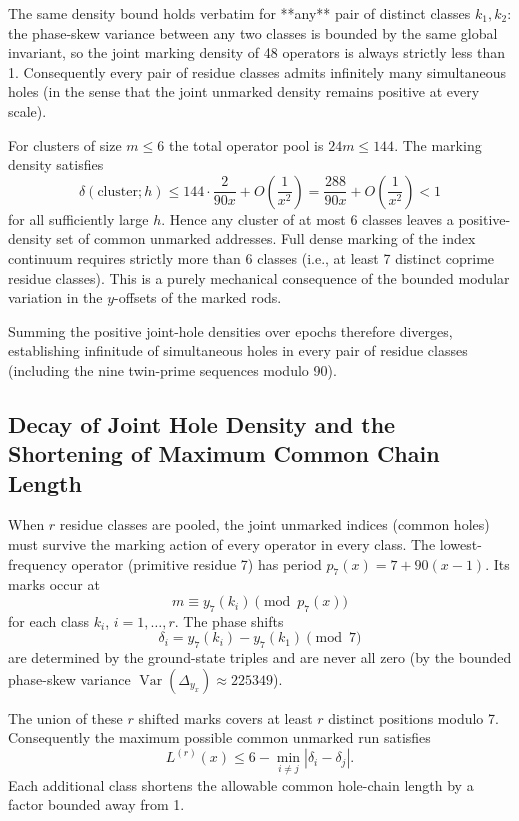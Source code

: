 \documentclass[11pt,a4paper]{article}
\begin{document}
The same density bound holds verbatim for **any** pair of distinct classes \(k_1, k_2\): the phase-skew variance between any two classes is bounded by the same global invariant, so the joint marking density of 48 operators is always strictly less than 1. Consequently every pair of residue classes admits infinitely many simultaneous holes (in the sense that the joint unmarked density remains positive at every scale).

For clusters of size \(m \le 6\) the total operator pool is \(24m \le 144\). The marking density satisfies
\[
\delta(\text{cluster}; h) \le 144 \cdot \frac{2}{90x} + O\left( \frac{1}{x^2} \right) = \frac{288}{90x} + O\left( \frac{1}{x^2} \right) < 1
\]
for all sufficiently large \(h\). Hence any cluster of at most 6 classes leaves a positive-density set of common unmarked addresses. Full dense marking of the index continuum requires strictly more than 6 classes (i.e., at least 7 distinct coprime residue classes). This is a purely mechanical consequence of the bounded modular variation in the \(y\)-offsets of the marked rods.

Summing the positive joint-hole densities over epochs therefore diverges, establishing infinitude of simultaneous holes in every pair of residue classes (including the nine twin-prime sequences modulo 90).

\subsection{Decay of Joint Hole Density and the Shortening of Maximum Common Chain Length}

When \(r\) residue classes are pooled, the joint unmarked indices (common holes) must survive the marking action of every operator in every class. The lowest-frequency operator (primitive residue 7) has period \(p_7(x)=7+90(x-1)\). Its marks occur at
\[
m \equiv y_7(k_i) \pmod{p_7(x)}
\]
for each class \(k_i\), \(i=1,\dots,r\). The phase shifts
\[
\delta_i = y_7(k_i) - y_7(k_1) \pmod{7}
\]
are determined by the ground-state triples and are never all zero (by the bounded phase-skew variance \(\operatorname{Var}(\Delta_{y_x})\approx225349\)).

The union of these \(r\) shifted marks covers at least \(r\) distinct positions modulo 7. Consequently the maximum possible common unmarked run satisfies
\[
L^{(r)}(x) \leq 6 - \min_{i\neq j}|\delta_i - \delta_j|.
\]
Each additional class shortens the allowable common hole-chain length by a factor bounded away from 1.
\end{document}
